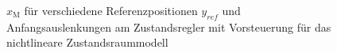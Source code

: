 \begin{figure}[H]
    \centering
    \caption[$x_{\mathrm{M}}$ für Regler mit Vorsteuerung (nichtlinear)]{$x_{\mathrm{M}}$ für verschiedene Referenzpositionen $y_{ref}$ und Anfangsauslenkungen am Zustandsregler mit Vorsteuerung für das nichtlineare Zustandsraummodell}
    \label{fig:Bild34}
\end{figure}

